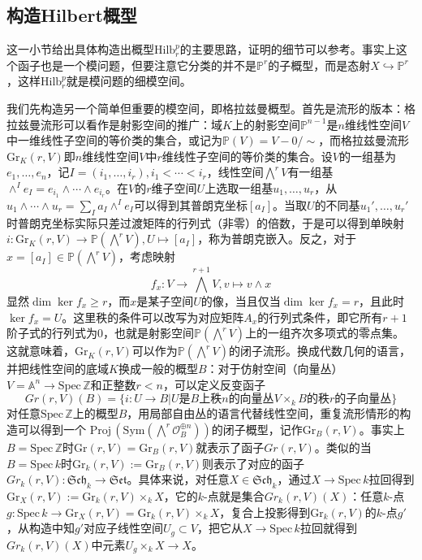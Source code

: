 \subsection{构造Hilbert概型}
这一小节给出具体构造出概型$ \mathrm{Hilb}_r^p $的主要思路，证明的细节可以参考\cite{GeometryAlgCurvesII,ModuliofCurves}。事实上这个函子也是一个模问题，但要注意它分类的并不是$ \mathbb{P}^r $的子概型，而是态射$ X\hookrightarrow \mathbb{P}^r $，这样$ \mathrm{Hilb}_r^p $就是模问题的细模空间。

我们先构造另一个简单但重要的模空间，即格拉兹曼概型。首先是流形的版本：格拉兹曼流形可以看作是射影空间的推广：域$ K $上的射影空间$ \mathbb{P}^{n-1} $是$ n $维线性空间$ V $中一维线性子空间的等价类的集合，或记为$ \mathbb{P}(V)=V-0/\sim $，而格拉兹曼流形$ \mathrm{Gr}_K(r,V) $即$ n $维线性空间$ V $中$ r $维线性子空间的等价类的集合。设$ V $的一组基为$ e_1,\ldots,e_n $，记$ I=(i_1,\ldots,i_r),i_1<\cdots <i_r $，线性空间$ \bigwedge ^rV $有一组基$ \wedge^Ie_I=e_{i_1}\wedge\cdots\wedge e_{i_r} $。在$ V $的$ r $维子空间$ U $上选取一组基$ u_1,\ldots,u_r $，从$ u_1\wedge\cdots\wedge u_r=\sum_{I}a_I\wedge^Ie_I $可以得到其普朗克坐标$ [a_I] $。当取$ U $的不同基$ u_1',\ldots,u_r' $时普朗克坐标实际只差过渡矩阵的行列式（非零）的倍数，于是可以得到单映射$ i:\mathrm{Gr}_K(r,V)\to \mathbb{P}(\bigwedge ^rV) ,U\mapsto [a_I] $，称为普朗克嵌入。反之，对于$ x=[a_I]\in \mathbb{P}(\bigwedge ^rV) $，考虑映射
$$f_x:V\to \bigwedge^{r+1}V,v\mapsto v\wedge x $$
显然$  \dim \ker f_x\geqslant r $，而$ x $是某子空间$ U $的像，当且仅当$ \dim \ker f_x=r $，且此时$ \ker f_x=U $。这里秩的条件可以改写为对应矩阵$ A_x $的行列式条件，即它所有$ r+1 $阶子式的行列式为$ 0 $，也就是射影空间$ \mathbb{P}(\bigwedge ^rV) $上的一组齐次多项式的零点集。这就意味着，$ \mathrm{Gr}_K(r,V) $可以作为$ \mathbb{P}(\bigwedge ^rV) $的闭子流形。换成代数几何的语言，并把线性空间的底域$ K $换成一般的概型$ B $：对于仿射空间（向量丛）$V= \mathbb{A}^n\to \mathrm{Spec}\,\mathbb{Z} $和正整数$ r<n $，可以定义反变函子
$$ Gr(r,V)(B)=\{i:U\to B|U\text{是}B\text{上秩} n \text{的向量丛}V\times _kB\text{的秩}r\text{的子向量丛} \} $$
对任意$ \mathrm{Spec}\,\mathbb{Z} $上的概型$ B $，用局部自由丛的语言代替线性空间，重复流形情形的构造可以得到一个
$ \mathrm{Proj} \,\left (\mathrm{Sym}(\bigwedge^r\mathscr{O}_B^{\oplus n})\right) $的闭子概型，记作$ \mathrm{Gr}_B(r,V) $。事实上$ B=\mathrm{Spec}\,\mathbb{Z} $时$  \mathrm{Gr}(r,V)=\mathrm{Gr}_{B}(r,V) $就表示了函子$ Gr(r,V) $。类似的当$ B=\mathrm{Spec}\,k $时$ \mathrm{Gr}_k(r,V):=\mathrm{Gr}_B(r,V) $则表示了对应的函子$ Gr_k(r,V):\mathfrak{Sch}_k\to \mathfrak{Set} $。具体来说，对任意$ X\in \mathfrak{Sch}_k $，通过$ X\to \mathrm{Spec}\,k $拉回得到$ \mathrm{Gr}_X(r,V):=\mathrm{Gr}_k(r,V)\times_kX$，它的$ k $-点就是集合$ Gr_k(r,V)(X)$：任意$ k $-点$ g:\mathrm{Spec}\,k\to \mathrm{Gr}_X(r,V)=\mathrm{Gr}_k(r,V)\times_kX $，复合上投影得到$ \mathrm{Gr}_k(r,V) $的$ k $-点$ g' $，从构造中知$ g' $对应子线性空间$ U_g\subset V $，把它从$ X\to \mathrm{Spec}\,k $拉回就得到$ Gr_k(r,V)(X) $中元素$ U_g\times_kX \to X$。

